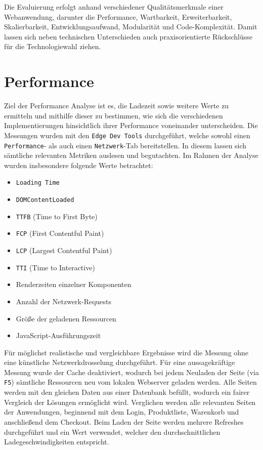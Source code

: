 \documentclass[oneside]{ausarbeitung}
\begin{document}
Die Evaluierung erfolgt anhand verschiedener Qualitätsmerkmale einer Webanwendung, darunter die Performance, Wartbarkeit, Erweiterbarkeit, Skalierbarkeit, Entwicklungsaufwand, Modularität und Code-Komplexität. Damit lassen sich neben technischen Unterschieden auch praxisorientierte Rückschlüsse für die Technologiewahl ziehen. 

\section{Performance}
Ziel der Performance Analyse ist es, die Ladezeit sowie weitere Werte zu ermitteln und mithilfe dieser zu bestimmen, wie sich die verschiedenen Implementierungen hinsichtlich ihrer Performance voneinander unterscheiden.
Die Messungen wurden mit den \texttt{Edge Dev Tools} durchgeführt, welche sowohl einen \texttt{Performance}- als auch einen \texttt{Netzwerk}-Tab bereitstellen. In diesem lassen sich sämtliche relevanten Metriken auslesen und begutachten. Im Rahmen der Analyse wurden insbesondere folgende Werte betrachtet:
\begin{itemize}
  \item \texttt{Loading Time}
  \item \texttt{DOMContentLoaded}
  \item \texttt{TTFB} (Time to First Byte)
  \item \texttt{FCP} (First Contentful Paint)
  \item \texttt{LCP} (Largest Contentful Paint)
  \item \texttt{TTI} (Time to Interactive)
  \item Renderzeiten einzelner Komponenten
  \item Anzahl der Netzwerk-Requests
  \item Größe der geladenen Ressourcen
  \item JavaScript-Ausführungszeit
\end{itemize}

Für möglichst realistische und vergleichbare Ergebnisse wird die Messung ohne eine künstliche Netzwerkdrosselung durchgeführt. Für eine aussagekräftige Messung wurde der Cache deaktiviert, wodurch bei jedem Neuladen der Seite (via \texttt{F5}) sämtliche Ressourcen neu vom lokalen Webserver geladen werden. 
Alle Seiten werden mit den gleichen Daten aus einer Datenbank befüllt, wodurch ein fairer Vergleich der Lösungen ermöglicht wird. 
Verglichen werden alle relevanten Seiten der Anwendungen, beginnend mit dem Login, Produktliste, Warenkorb und anschließend dem Checkout.
Beim Laden der Seite werden mehrere Refreshes durchgeführt und ein Wert verwendet, welcher den durchschnittlichen Ladegeschwindigkeiten entspricht.
\end{document}
